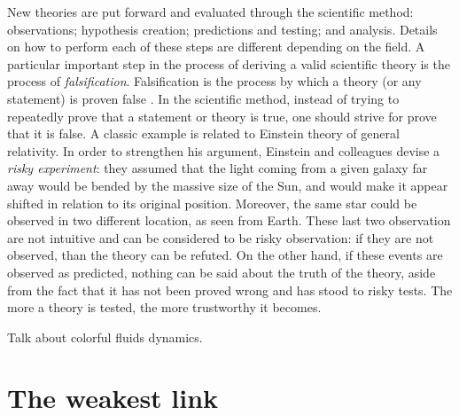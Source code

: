 New theories are put forward and evaluated through the scientific method: observations; hypothesis creation; predictions and testing; and analysis. Details on how to perform each of these steps are different depending on the field. A particular important step in the process of deriving a valid scientific theory is the process of \emph{falsification}. Falsification is the process by which a theory (or any statement) is proven false \cite{KarlPopper}. In the scientific method, instead of trying to repeatedly prove that a statement or theory is true, one should strive for prove that it is false. A classic example is related to Einstein theory of general relativity. In order to strengthen his argument, Einstein and colleagues devise a \emph{risky experiment}: they assumed that the light coming from a given galaxy far away would be bended by the massive size of the Sun, and would make it appear shifted in relation to its original position. Moreover, the same star could be observed in two different location, as seen from Earth. These last two observation are not intuitive and can be considered to be risky observation: if they are not observed, than the theory can be refuted. On the other hand, if these events are observed as predicted, nothing can be said about the truth of the theory, aside from the fact that it has not been proved wrong and has stood to risky tests. The more a theory is tested, the more trustworthy it becomes. 

Talk about colorful fluids dynamics.
\section{The weakest link}


